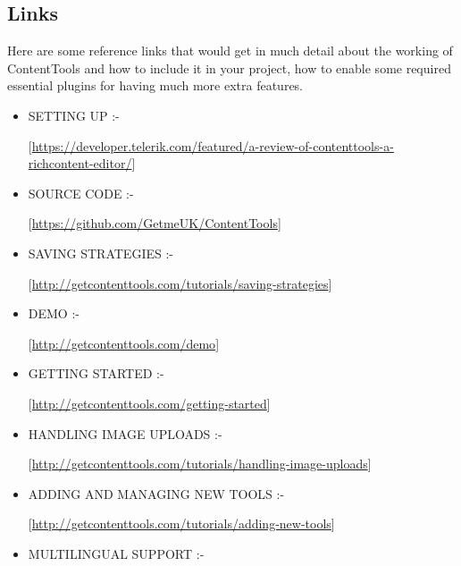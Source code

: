 \subsection{Links}
Here are some reference links that would get in much detail about the working of
ContentTools and how to include it in your project, how to enable some required essential
plugins for having much more extra features.  \newline
\begin{itemize}
\item SETTING UP :- \newline
\begin{center}
[\url{https://developer.telerik.com/featured/a-review-of-contenttools-a-richcontent-editor/}]
\end{center}
\item SOURCE CODE :- \newline
\begin{center}
[\url{https://github.com/GetmeUK/ContentTools}]
\end{center} 
\item SAVING STRATEGIES :- \newline
\begin{center}
[\url{http://getcontenttools.com/tutorials/saving-strategies}]
\end{center}
\item DEMO :- \newline
\begin{center}
[\url{http://getcontenttools.com/demo}]
\end{center}
\item GETTING STARTED :- \newline 
\begin{center}
[\url{http://getcontenttools.com/getting-started}]
\end{center}
\item HANDLING IMAGE UPLOADS :- \newline
\begin{center}
[\url{http://getcontenttools.com/tutorials/handling-image-uploads}]
\end{center}
\item ADDING AND MANAGING NEW TOOLS :-  \newline
\begin{center}
[\url{http://getcontenttools.com/tutorials/adding-new-tools}]
\end{center}
\item MULTILINGUAL SUPPORT :- \newline

\end{itemize}
